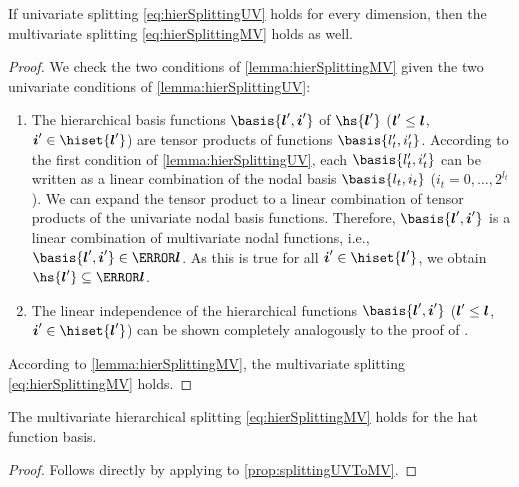 \begin{proposition}
  \label{prop:splittingUVToMV}
  If univariate splitting \eqref{eq:hierSplittingUV} holds for every dimension,
  then the multivariate splitting \eqref{eq:hierSplittingMV} holds as well.
\end{proposition}
\begin{proof}
  We check the two conditions of \cref{lemma:hierSplittingMV}
  given the two univariate conditions of \cref{lemma:hierSplittingUV}:
  \begin{enumerate}
    \item
    The hierarchical basis functions $\basis{\*l',\*i'}$
    of $\hs{\*l'}$ (${\boldsymbol{l}}' \le {\boldsymbol{l}}$, $\*i' \in \hiset{\*l'}$) are tensor products
    of functions $\basis{l_t',i_t'}$.
    According to the first condition of \cref{lemma:hierSplittingUV},
    each $\basis{l_t',i_t'}$ can be written as a linear combination of
    the nodal basis $\basis{l_t,i_t}$ ($i_t = 0, \dotsc, 2^{l_t}$).
    We can expand the tensor product to a linear combination
    of tensor products of the univariate nodal basis functions.
    Therefore, $\basis{\*l',\*i'}$ is a linear combination of
    multivariate nodal functions, i.e., $\basis{\*l',\*i'} \in \ns{\*l}$.
    As this is true for all $\*i' \in \hiset{\*l'}$, we obtain
    $\hs{\*l'} \subset \ns{\*l}$.
    
    \item
    The linear independence of the hierarchical functions $\basis{\*l',\*i'}$
    (${\boldsymbol{l}}' \le {\boldsymbol{l}}$, $\*i' \in \hiset{\*l'}$) can be shown completely analogously
    to the proof of .
  \end{enumerate}
  According to \cref{lemma:hierSplittingMV},
  the multivariate splitting \eqref{eq:hierSplittingMV} holds.
\end{proof}
\begin{corollary}
  \label{cor:hierSplittingHatMV}
  The multivariate hierarchical splitting \eqref{eq:hierSplittingMV}
  holds for the hat function basis.
\end{corollary}
\begin{proof}
  Follows directly by applying
   to \cref{prop:splittingUVToMV}.
\end{proof}
